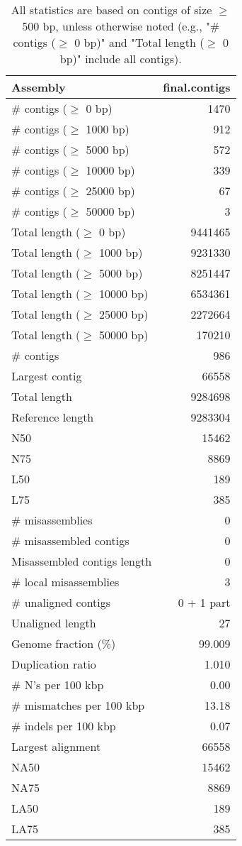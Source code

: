\documentclass[12pt,a4paper]{article}
\begin{document}
\begin{table}[ht]
\begin{center}
\caption{All statistics are based on contigs of size $\geq$ 500 bp, unless otherwise noted (e.g., "\# contigs ($\geq$ 0 bp)" and "Total length ($\geq$ 0 bp)" include all contigs).}
\begin{tabular}{|l*{1}{|r}|}
\hline
Assembly & final.contigs \\ \hline
\# contigs ($\geq$ 0 bp) & 1470 \\ \hline
\# contigs ($\geq$ 1000 bp) & 912 \\ \hline
\# contigs ($\geq$ 5000 bp) & 572 \\ \hline
\# contigs ($\geq$ 10000 bp) & 339 \\ \hline
\# contigs ($\geq$ 25000 bp) & 67 \\ \hline
\# contigs ($\geq$ 50000 bp) & 3 \\ \hline
Total length ($\geq$ 0 bp) & 9441465 \\ \hline
Total length ($\geq$ 1000 bp) & 9231330 \\ \hline
Total length ($\geq$ 5000 bp) & 8251447 \\ \hline
Total length ($\geq$ 10000 bp) & 6534361 \\ \hline
Total length ($\geq$ 25000 bp) & 2272664 \\ \hline
Total length ($\geq$ 50000 bp) & 170210 \\ \hline
\# contigs & 986 \\ \hline
Largest contig & 66558 \\ \hline
Total length & 9284698 \\ \hline
Reference length & 9283304 \\ \hline
N50 & 15462 \\ \hline
N75 & 8869 \\ \hline
L50 & 189 \\ \hline
L75 & 385 \\ \hline
\# misassemblies & 0 \\ \hline
\# misassembled contigs & 0 \\ \hline
Misassembled contigs length & 0 \\ \hline
\# local misassemblies & 3 \\ \hline
\# unaligned contigs & 0 + 1 part \\ \hline
Unaligned length & 27 \\ \hline
Genome fraction (\%) & 99.009 \\ \hline
Duplication ratio & 1.010 \\ \hline
\# N's per 100 kbp & 0.00 \\ \hline
\# mismatches per 100 kbp & 13.18 \\ \hline
\# indels per 100 kbp & 0.07 \\ \hline
Largest alignment & 66558 \\ \hline
NA50 & 15462 \\ \hline
NA75 & 8869 \\ \hline
LA50 & 189 \\ \hline
LA75 & 385 \\ \hline
\end{tabular}
\end{center}
\end{table}
\end{document}
